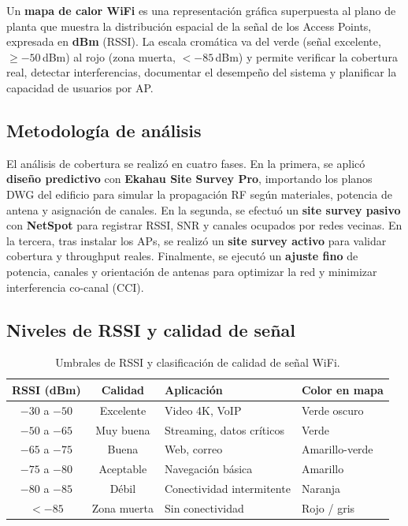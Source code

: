 Un \textbf{mapa de calor WiFi} es una representación gráfica superpuesta al plano
de planta que muestra la distribución espacial de la señal de los Access Points,
expresada en \textbf{dBm} (RSSI). La escala cromática va del verde (señal
excelente, $\geq -50$\,dBm) al rojo (zona muerta, $< -85$\,dBm) y permite
verificar la cobertura real, detectar interferencias, documentar el desempeño del
sistema y planificar la capacidad de usuarios por AP.

\subsection{Metodología de análisis}

El análisis de cobertura se realizó en cuatro fases. En la primera, se aplicó
\textbf{diseño predictivo} con \textbf{Ekahau Site Survey Pro}, importando los
planos DWG del edificio para simular la propagación RF según materiales, potencia
de antena y asignación de canales. En la segunda, se efectuó un \textbf{site
survey pasivo} con \textbf{NetSpot} para registrar RSSI, SNR y canales ocupados
por redes vecinas. En la tercera, tras instalar los APs, se realizó un \textbf{site
survey activo} para validar cobertura y throughput reales. Finalmente, se ejecutó
un \textbf{ajuste fino} de potencia, canales y orientación de antenas para
optimizar la red y minimizar interferencia co-canal (CCI).

\subsection{Niveles de RSSI y calidad de señal}

\begin{table}[H]
    \centering
    \caption{Umbrales de RSSI y clasificación de calidad de señal WiFi.}
    \label{tab:rssi}
    \begin{tabular}{|c|c|p{5cm}|p{3cm}|}
        \hline
        \textbf{RSSI (dBm)} & \textbf{Calidad} & \textbf{Aplicación} &
        \textbf{Color en mapa} \\
        \hline
        $-30$ a $-50$ & Excelente  & Video 4K, VoIP              & Verde oscuro \\
        \hline
        $-50$ a $-65$ & Muy buena  & Streaming, datos críticos   & Verde \\
        \hline
        $-65$ a $-75$ & Buena      & Web, correo                 & Amarillo-verde \\
        \hline
        $-75$ a $-80$ & Aceptable  & Navegación básica           & Amarillo \\
        \hline
        $-80$ a $-85$ & Débil      & Conectividad intermitente   & Naranja \\
        \hline
        $< -85$       & Zona muerta & Sin conectividad           & Rojo / gris \\
        \hline
    \end{tabular}
\end{table}

